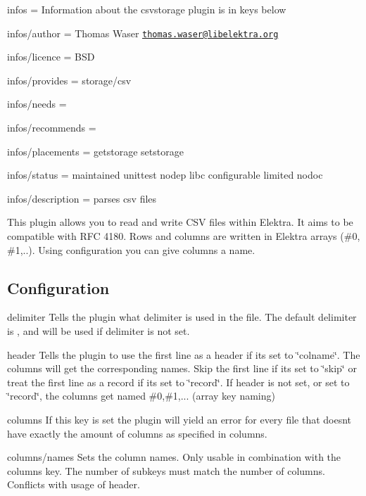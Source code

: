 
\begin{DoxyItemize}
\item infos = Information about the csvstorage plugin is in keys below
\item infos/author = Thomas Waser \href{mailto:thomas.waser@libelektra.org}{\tt thomas.\+waser@libelektra.\+org}
\item infos/licence = B\+SD
\item infos/provides = storage/csv
\item infos/needs =
\item infos/recommends =
\item infos/placements = getstorage setstorage
\item infos/status = maintained unittest nodep libc configurable limited nodoc
\item infos/description = parses csv files
\end{DoxyItemize}

This plugin allows you to read and write C\+SV files within Elektra. It aims to be compatible with R\+FC 4180. Rows and columns are written in Elektra arrays ({\ttfamily \#0}, {\ttfamily \#1},..). Using configuration you can give columns a name.

\subsection*{Configuration}

{\ttfamily delimiter} Tells the plugin what delimiter is used in the file. The default delimiter is {\ttfamily ,} and will be used if {\ttfamily delimiter} is not set.

{\ttfamily header} Tells the plugin to use the first line as a header if it\textquotesingle{}s set to \char`\"{}colname\char`\"{}. The columns will get the corresponding names. Skip the first line if it\textquotesingle{}s set to \char`\"{}skip\char`\"{} or treat the first line as a record if it\textquotesingle{}s set to \char`\"{}record\char`\"{}. If {\ttfamily header} is not set, or set to \char`\"{}record\char`\"{}, the columns get named \#0,\#1,... (array key naming)

{\ttfamily columns} If this key is set the plugin will yield an error for every file that doesn\textquotesingle{}t have exactly the amount of columns as specified in {\ttfamily columns}.

{\ttfamily columns/names} Sets the column names. Only usable in combination with the {\ttfamily columns} key. The number of subkeys must match the number of columns. Conflicts with usage of {\ttfamily header}.

